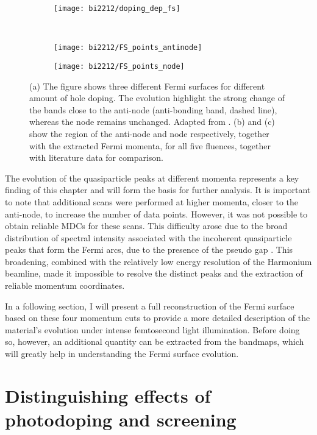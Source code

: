 \begin{figure}[b!]
	\centering
	\begin{subfigure}[b]{\textwidth}
		\texttt{[image: bi2212/doping\_dep\_fs]}
		\caption{}
	\end{subfigure}
	\\
	\begin{subfigure}[b]{0.49\textwidth}
		\texttt{[image: bi2212/FS\_points\_antinode]}
		\caption{}
	\end{subfigure}
	\hfill
	\begin{subfigure}[b]{0.49\textwidth}
		\texttt{[image: bi2212/FS\_points\_node]}
		\caption{}
	\end{subfigure}
	\caption{(a) The figure shows three different Fermi surfaces for different amount of hole doping. The evolution highlight the strong change of the bands close to the anti-node (anti-bonding band, dashed line), whereas the node remains unchanged. Adapted from \cite{drozdov_phase_2018}. (b) and (c) show the region of the anti-node and node respectively, together with the extracted Fermi momenta, for all five fluences, together with literature data for comparison.}
	\label{fig:FS_points_zoom}
\end{figure}

The evolution of the quasiparticle peaks at different momenta represents a key finding of this chapter and will form the basis for further analysis.
It is important to note that additional scans were performed at higher momenta, closer to the anti-node, to increase the number of data points.
However, it was not possible to obtain reliable MDCs for these scans.
This difficulty arose due to the broad distribution of spectral intensity associated with the incoherent quasiparticle peaks that form the Fermi arcs, due to the presence of the pseudo gap \cite{norman_destruction_1998}.
This broadening, combined with the relatively low energy resolution of the Harmonium beamline, made it impossible to resolve the distinct peaks and the extraction of reliable momentum coordinates.

In a following section, I will present a full reconstruction of the Fermi surface based on these four momentum cuts to provide a more detailed description of the material’s evolution under intense femtosecond light illumination.
Before doing so, however, an additional quantity can be extracted from the bandmaps, which will greatly help in understanding the Fermi surface evolution.

\section{Distinguishing effects of photodoping and screening}
\label{sec:mu}

